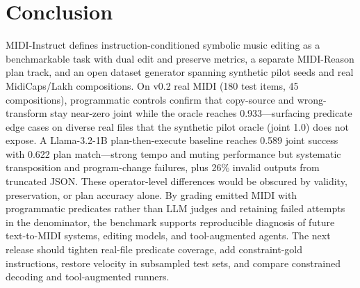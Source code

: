 \section{Conclusion}

MIDI-Instruct defines instruction-conditioned symbolic music editing as a benchmarkable task with dual edit and preserve metrics, a separate MIDI-Reason plan track, and an open dataset generator spanning synthetic pilot seeds and real MidiCaps/Lakh compositions. On v0.2 real MIDI (180 test items, 45 compositions), programmatic controls confirm that copy-source and wrong-transform stay near-zero joint while the oracle reaches 0.933---surfacing predicate edge cases on diverse real files that the synthetic pilot oracle (joint 1.0) does not expose. A Llama-3.2-1B plan-then-execute baseline reaches 0.589 joint success with 0.622 plan match---strong tempo and muting performance but systematic transposition and program-change failures, plus 26\% invalid outputs from truncated JSON. These operator-level differences would be obscured by validity, preservation, or plan accuracy alone. By grading emitted MIDI with programmatic predicates rather than LLM judges and retaining failed attempts in the denominator, the benchmark supports reproducible diagnosis of future text-to-MIDI systems, editing models, and tool-augmented agents. The next release should tighten real-file predicate coverage, add constraint-gold instructions, restore velocity in subsampled test sets, and compare constrained decoding and tool-augmented runners.
